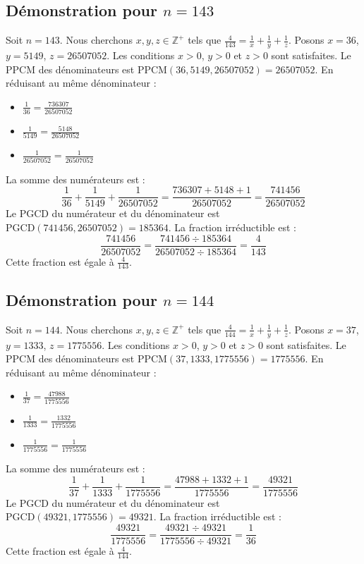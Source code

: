 \documentclass[11pt,a4paper]{article}
\begin{document}
\subsection{Démonstration pour $n = 143$}
Soit $n = 143$. Nous cherchons $x, y, z \in \mathbb{Z}^{+}$ tels que $\frac{4}{143} = \frac{1}{x} + \frac{1}{y} + \frac{1}{z}$.
Posons $x = 36$, $y = 5149$, $z = 26507052$.
Les conditions $x > 0$, $y > 0$ et $z > 0$ sont satisfaites.
Le PPCM des dénominateurs est $\text{PPCM}(36, 5149, 26507052) = 26507052$.
En réduisant au même dénominateur :
\begin{itemize}
    \item $\frac{1}{36} = \frac{736307}{26507052}$
    \item $\frac{1}{5149} = \frac{5148}{26507052}$
    \item $\frac{1}{26507052} = \frac{1}{26507052}$
\end{itemize}
La somme des numérateurs est :
$$ \frac{1}{36} + \frac{1}{5149} + \frac{1}{26507052} = \frac{736307 + 5148 + 1}{26507052} = \frac{741456}{26507052} $$
Le PGCD du numérateur et du dénominateur est $\text{PGCD}(741456, 26507052) = 185364$.
La fraction irréductible est :
$$ \frac{741456}{26507052} = \frac{741456 \div 185364}{26507052 \div 185364} = \frac{4}{143} $$
Cette fraction est égale à $\frac{4}{143}$.

\subsection{Démonstration pour $n = 144$}
Soit $n = 144$. Nous cherchons $x, y, z \in \mathbb{Z}^{+}$ tels que $\frac{4}{144} = \frac{1}{x} + \frac{1}{y} + \frac{1}{z}$.
Posons $x = 37$, $y = 1333$, $z = 1775556$.
Les conditions $x > 0$, $y > 0$ et $z > 0$ sont satisfaites.
Le PPCM des dénominateurs est $\text{PPCM}(37, 1333, 1775556) = 1775556$.
En réduisant au même dénominateur :
\begin{itemize}
    \item $\frac{1}{37} = \frac{47988}{1775556}$
    \item $\frac{1}{1333} = \frac{1332}{1775556}$
    \item $\frac{1}{1775556} = \frac{1}{1775556}$
\end{itemize}
La somme des numérateurs est :
$$ \frac{1}{37} + \frac{1}{1333} + \frac{1}{1775556} = \frac{47988 + 1332 + 1}{1775556} = \frac{49321}{1775556} $$
Le PGCD du numérateur et du dénominateur est $\text{PGCD}(49321, 1775556) = 49321$.
La fraction irréductible est :
$$ \frac{49321}{1775556} = \frac{49321 \div 49321}{1775556 \div 49321} = \frac{1}{36} $$
Cette fraction est égale à $\frac{4}{144}$.
\end{document}

